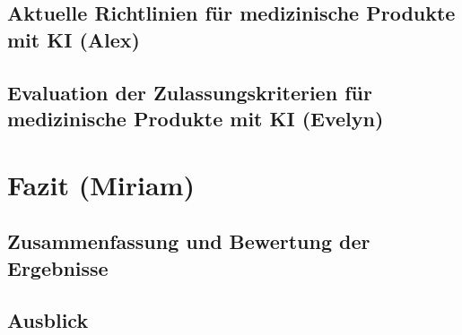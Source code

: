 \documentclass[a4paper, 11pt]{article}
\begin{document}
		\subsection{Aktuelle Richtlinien für medizinische Produkte mit KI \small{(Alex)}}\label{sec:guidlines}
			
		\subsection{Evaluation der Zulassungskriterien für medizinische Produkte mit KI \small{(Evelyn)}}\label{sec:sufficient-criteria}
			
		
	
	\newpage
	\section{Fazit \small{(Miriam)}}\label{sec:conclusion}
		
		\subsection{Zusammenfassung und Bewertung der Ergebnisse}\label{sec:summary}
			
		\subsection{Ausblick}\label{sec:perspective}
			
	  

    \newpage
    \printglossary[type=\acronymtype,title={Akronyme}]
   
    \newpage
    \nocite{*}
    \printbibliography[heading=bibintoc,type=article, title={Literatur}]
	
    \newpage
    \printglossary[type=main,title={Glossar}]
\end{document}
